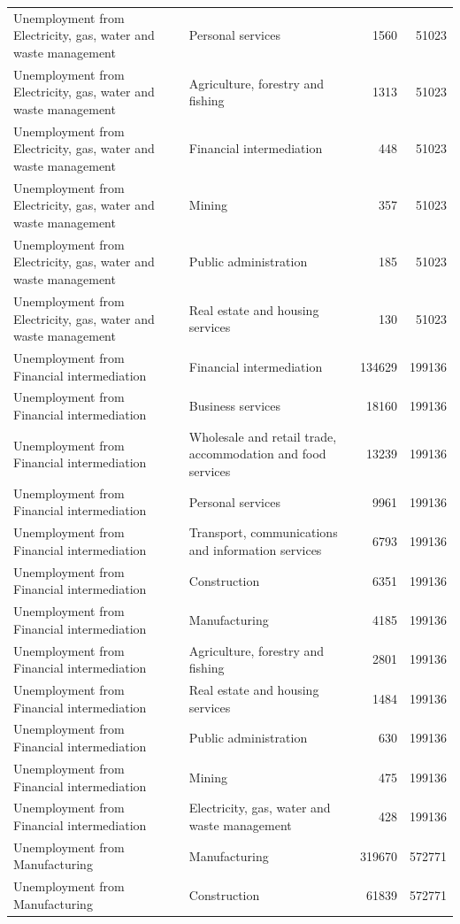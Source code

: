 \begin{longtable}{llrr}
Unemployment from Electricity, gas, water and waste management & Personal services & 1560 & 51023 \\
Unemployment from Electricity, gas, water and waste management & Agriculture, forestry and fishing & 1313 & 51023 \\
Unemployment from Electricity, gas, water and waste management & Financial intermediation & 448 & 51023 \\
Unemployment from Electricity, gas, water and waste management & Mining & 357 & 51023 \\
Unemployment from Electricity, gas, water and waste management & Public administration & 185 & 51023 \\
Unemployment from Electricity, gas, water and waste management & Real estate and housing services & 130 & 51023 \\
Unemployment from Financial intermediation & Financial intermediation & 134629 & 199136 \\
Unemployment from Financial intermediation & Business services & 18160 & 199136 \\
Unemployment from Financial intermediation & Wholesale and retail trade, accommodation and food services & 13239 & 199136 \\
Unemployment from Financial intermediation & Personal services & 9961 & 199136 \\
Unemployment from Financial intermediation & Transport, communications and information services & 6793 & 199136 \\
Unemployment from Financial intermediation & Construction & 6351 & 199136 \\
Unemployment from Financial intermediation & Manufacturing & 4185 & 199136 \\
Unemployment from Financial intermediation & Agriculture, forestry and fishing & 2801 & 199136 \\
Unemployment from Financial intermediation & Real estate and housing services & 1484 & 199136 \\
Unemployment from Financial intermediation & Public administration & 630 & 199136 \\
Unemployment from Financial intermediation & Mining & 475 & 199136 \\
Unemployment from Financial intermediation & Electricity, gas, water and waste management & 428 & 199136 \\
Unemployment from Manufacturing & Manufacturing & 319670 & 572771 \\
Unemployment from Manufacturing & Construction & 61839 & 572771 \\

\end{longtable}
